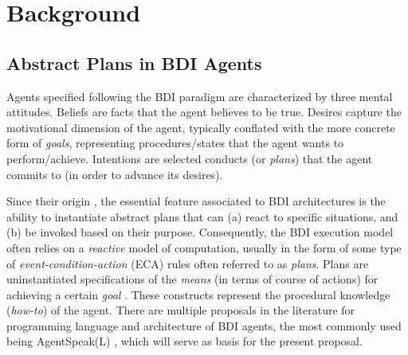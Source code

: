 

\section{Background} 
\label{sec:2}
\subsection{Abstract Plans in BDI Agents}

Agents specified following the BDI paradigm are characterized by three mental attitudes. Beliefs are facts that the agent believes to be true. Desires capture the motivational dimension of the agent, typically conflated with the more concrete form of \textit{goals}, representing procedures/states that the agent wants to perform/achieve. Intentions are selected conducts (or \textit{plans}) that the agent commits to (in order to advance its desires). 

Since their origin \cite{Rao1995}, the essential feature associated to BDI architectures is the ability to instantiate abstract plans that can (a) react to specific situations, and (b) be invoked based on their purpose. Consequently, the BDI execution model often relies on a \textit{reactive} model of computation, usually in the form of some type of \textit{event-condition-action} (ECA) rules often referred to as \textit{plans}. Plans are uninstantiated specifications of the \textit{means} (in terms of course of actions) for achieving a certain \textit{goal} \cite{Rao1995}. These constructs represent the procedural knowledge (\textit{how-to}) of the agent. There are multiple proposals in the literature for programming language and architecture of BDI agents, the most commonly used being AgentSpeak(L) \cite{RaoAS1996}, which will serve as basis for the present proposal. %

